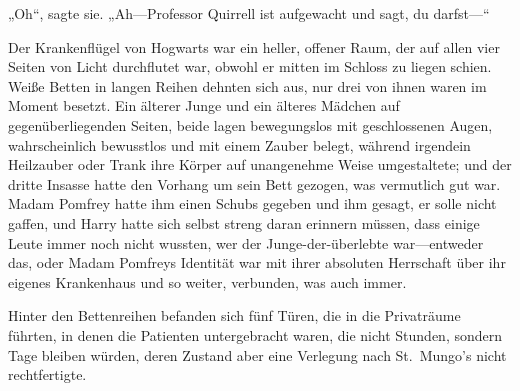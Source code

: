 „Oh“, sagte sie. „Ah—Professor Quirrell ist aufgewacht und sagt, du darfst—“

\later

Der Krankenflügel von Hogwarts war ein heller, offener Raum, der auf allen vier Seiten von Licht durchflutet war, obwohl er mitten im Schloss zu liegen schien. Weiße Betten in langen Reihen dehnten sich aus, nur drei von ihnen waren im Moment besetzt. Ein älterer Junge und ein älteres Mädchen auf gegenüberliegenden Seiten, beide lagen bewegungslos mit geschlossenen Augen, wahrscheinlich bewusstlos und mit einem Zauber belegt, während irgendein Heilzauber oder Trank ihre Körper auf unangenehme Weise umgestaltete; und der dritte Insasse hatte den Vorhang um sein Bett gezogen, was vermutlich gut war. Madam Pomfrey hatte ihm einen Schubs gegeben und ihm gesagt, er solle nicht gaffen, und Harry hatte sich selbst streng daran erinnern müssen, dass einige Leute immer noch nicht wussten, wer der Junge-der-überlebte war—entweder das, oder Madam Pomfreys Identität war mit ihrer absoluten Herrschaft über ihr eigenes Krankenhaus und so weiter, verbunden, was auch immer.

Hinter den Bettenreihen befanden sich fünf Türen, die in die Privaträume führten, in denen die Patienten untergebracht waren, die nicht Stunden, sondern Tage bleiben würden, deren Zustand aber eine Verlegung nach St.~Mungo’s nicht rechtfertigte.


